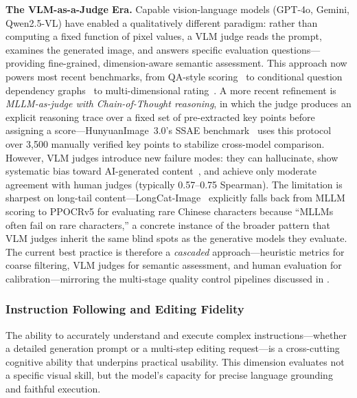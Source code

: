 \documentclass{llmxive}
\begin{document}
\textbf{The VLM-as-a-Judge Era.}
Capable vision-language models (GPT-4o, Gemini, Qwen2.5-VL) have enabled a qualitatively different paradigm: rather than computing a fixed function of pixel values, a VLM judge reads the prompt, examines the generated image, and answers specific evaluation questions---providing fine-grained, dimension-aware semantic assessment. This approach now powers most recent benchmarks, from QA-style scoring~\citep{chen2025r2ibench} to conditional question dependency graphs~\citep{OneIG-Bench} to multi-dimensional rating~\citep{ImagenWorld}. A more recent refinement is \emph{MLLM-as-judge with Chain-of-Thought reasoning}, in which the judge produces an explicit reasoning trace over a fixed set of pre-extracted key points before assigning a score---HunyuanImage~3.0's SSAE benchmark~\citep{cao2025hunyuanimage} uses this protocol over 3{,}500 manually verified key points to stabilize cross-model comparison. However, VLM judges introduce new failure modes: they can hallucinate, show systematic bias toward AI-generated content~\citep{taesiri2025understanding}, and achieve only moderate agreement with human judges (typically 0.57--0.75 Spearman). The limitation is sharpest on long-tail content---LongCat-Image~\citep{team2025longcat} explicitly falls back from MLLM scoring to PPOCRv5 for evaluating rare Chinese characters because ``MLLMs often fail on rare characters,'' a concrete instance of the broader pattern that VLM judges inherit the same blind spots as the generative models they evaluate. The current best practice is therefore a \emph{cascaded} approach---heuristic metrics for coarse filtering, VLM judges for semantic assessment, and human evaluation for calibration---mirroring the multi-stage quality control pipelines discussed in .


\subsubsection{Instruction Following and Editing Fidelity}

The ability to accurately understand and execute complex instructions---whether a detailed generation prompt or a multi-step editing request---is a cross-cutting cognitive ability that underpins practical usability. This dimension evaluates not a specific visual skill, but the model's capacity for precise language grounding and faithful execution.
\end{document}

